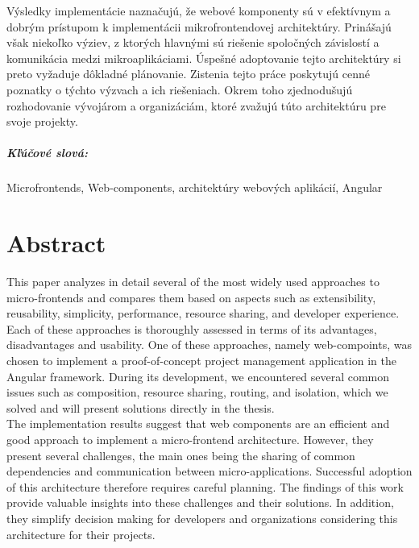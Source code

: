 \documentclass[12pt, oneside]{book}  %
\begin{document}
\noindent
Výsledky implementácie naznačujú, že webové komponenty sú v efektívnym a dobrým prístupom k implementácii mikrofrontendovej architektúry. Prinášajú však niekoľko výziev, z ktorých hlavnými sú riešenie spoločných závislostí a komunikácia medzi mikroaplikáciami. Úspešné adoptovanie tejto architektúry si preto vyžaduje dôkladné plánovanie. Zistenia tejto práce poskytujú cenné poznatky o týchto výzvach a ich riešeniach. Okrem toho zjednodušujú rozhodovanie vývojárom a organizáciám, ktoré zvažujú túto architektúru pre svoje projekty.

\paragraph*{Kľúčové slová:} Microfrontends, Web-components, architektúry webových aplikácií, Angular


\newpage 
\thispagestyle{empty}
\chapter*{Abstract}\label{chap:abstract_en}
This paper analyzes in detail several of the most widely used approaches to micro-frontends and compares them based on aspects such as extensibility, reusability, simplicity, performance, resource sharing, and developer experience. Each of these approaches is thoroughly assessed in terms of its advantages, disadvantages and usability. One of these approaches, namely web-compoints, was chosen to implement a proof-of-concept project management application in the Angular framework. During its development, we encountered several common issues such as composition, resource sharing, routing, and isolation, which we solved and will present solutions directly in the thesis. \\

\noindent
The implementation results suggest that web components are an efficient and good approach to implement a micro-frontend architecture. However, they present several challenges, the main ones being the sharing of common dependencies and communication between micro-applications. Successful adoption of this architecture therefore requires careful planning. The findings of this work provide valuable insights into these challenges and their solutions. In addition, they simplify decision making for developers and organizations considering this architecture for their projects.
\end{document}
